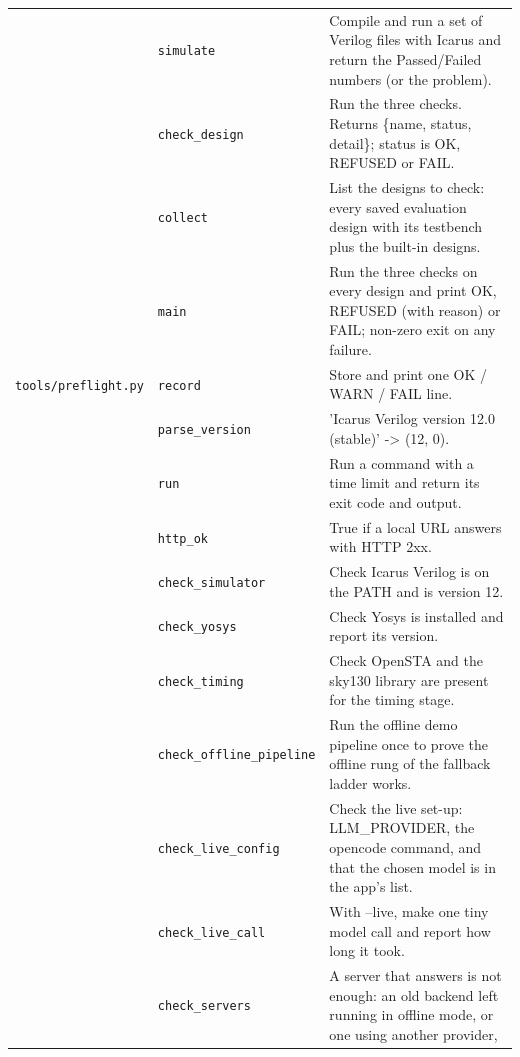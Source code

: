 \begin{longtable}{@{}p{2.8cm}>{\raggedright\arraybackslash}p{4.6cm}p{7.9cm}@{}}
{\small } & \texttt{\small simulate} & Compile and run a set of Verilog files with Icarus and return the Passed/Failed numbers (or the problem). \\
{\small } & \texttt{\small check\_\allowbreak{}design} & Run the three checks. Returns \{name, status, detail\}; status is OK, REFUSED or FAIL. \\
{\small } & \texttt{\small collect} & List the designs to check: every saved evaluation design with its testbench plus the built-in designs. \\
{\small } & \texttt{\small main} & Run the three checks on every design and print OK, REFUSED (with reason) or FAIL; non-zero exit on any failure. \\
{\small \nolinkurl{tools/preflight.py}} & \texttt{\small record} & Store and print one OK / WARN / FAIL line. \\
{\small } & \texttt{\small parse\_\allowbreak{}version} & 'Icarus Verilog version 12.0 (stable)' -\textgreater{} (12, 0). \\
{\small } & \texttt{\small run} & Run a command with a time limit and return its exit code and output. \\
{\small } & \texttt{\small http\_\allowbreak{}ok} & True if a local URL answers with HTTP 2xx. \\
{\small } & \texttt{\small check\_\allowbreak{}simulator} & Check Icarus Verilog is on the PATH and is version 12. \\
{\small } & \texttt{\small check\_\allowbreak{}yosys} & Check Yosys is installed and report its version. \\
{\small } & \texttt{\small check\_\allowbreak{}timing} & Check OpenSTA and the sky130 library are present for the timing stage. \\
{\small } & \texttt{\small check\_\allowbreak{}offline\_\allowbreak{}pipeline} & Run the offline demo pipeline once to prove the offline rung of the fallback ladder works. \\
{\small } & \texttt{\small check\_\allowbreak{}live\_\allowbreak{}config} & Check the live set-up: LLM\_PROVIDER, the opencode command, and that the chosen model is in the app's list. \\
{\small } & \texttt{\small check\_\allowbreak{}live\_\allowbreak{}call} & With --live, make one tiny model call and report how long it took. \\
{\small } & \texttt{\small check\_\allowbreak{}servers} & A server that answers is not enough: an old backend left running in offline mode, or one using another provider, \\

\end{longtable}
